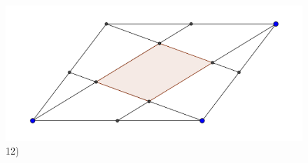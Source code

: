 \begin{figure}[!h]
\endminipage\hfill
{}
\includegraphics[width=1.2\linewidth]{4}
\caption{12)}
\endminipage\hfill
{}
\endminipage
\end{figure}

\quad\newpage